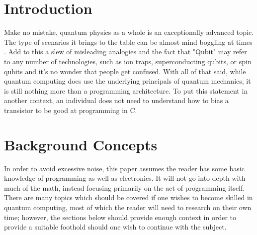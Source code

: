 \documentclass[a4paper]{article}
\begin{document}
\section{Introduction}
\label{sec:introduction}





Make no mistake, quantum physics as a whole is an exceptionally advanced topic.  The type of scenarios it brings to the table can be almost mind boggling at times \cite{mindBoggle}.  Add to this a slew of misleading analogies and the fact that "Qubit" may refer to any number of technologies, such as ion traps, superconducting qubits, or spin qubits and it's no wonder that people get confused.   With all of that said, while quantum computing does use the underlying principals of quantum mechanics, it is still nothing more than a programming architecture.  To put this statement in another context, an individual does not need to understand how to bias a transistor to be good at programming in C.




\section{Background Concepts}
\label{sec:backgroundconcepts}
In order to avoid excessive noise, this paper assumes the reader has some basic knowledge of programming as well as electronics.  It will not go into depth with much of the math, instead focusing primarily on the act of programming itself.  There are many topics which should be covered if one wishes to become skilled in quantum computing, most of which the reader will need to research on their own time; however, the sections below should provide enough context in order to provide a suitable foothold should one wish to continue with the subject.
\end{document}

